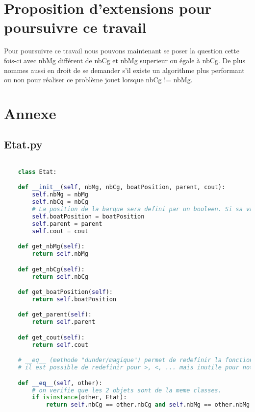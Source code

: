 \documentclass[a4paper, 12pt, french,oneside]{book}
\begin{document}
\chapter{Proposition d'extensions pour poursuivre ce travail}
Pour poursuivre ce travail nous pouvons maintenant se poser la question cette fois-ci avec nbMg différent de nbCg et nbMg superieur ou égale à nbCg. De plus nommes aussi en droit de se demander s'il existe un algorithme plus performant ou non pour réaliser ce problème jouet lorsque nbCg != nbMg.

\appendix
\chapter{Annexe}
\section{Etat.py}
\begin{lstlisting}[language=Python, caption=Python example] 

    class Etat:

    def __init__(self, nbMg, nbCg, boatPosition, parent, cout):
        self.nbMg = nbMg
        self.nbCg = nbCg
        # La position de la barque sera defini par un booleen. Si sa valeur est egale a vraie alors la barque est a guache sinon elle est a droite
        self.boatPosition = boatPosition
        self.parent = parent
        self.cout = cout

    def get_nbMg(self):
        return self.nbMg

    def get_nbCg(self):
        return self.nbCg

    def get_boatPosition(self):
        return self.boatPosition

    def get_parent(self):
        return self.parent

    def get_cout(self):
        return self.cout

    # __eq__ (methode "dunder/magique") permet de redefinir la fonction ==. Cela nous sera utile pour verifie si 2 etats sont egaux. (fonctionne avec .remove() pour la comparaison d'etat)
    # il est possible de redefinir pour >, <, ... mais inutile pour notre cas.

    def __eq__(self, other):
        # on verifie que les 2 objets sont de la meme classes.
        if isinstance(other, Etat):
            return self.nbCg == other.nbCg and self.nbMg == other.nbMg and self.boatPosition == other.boatPosition
\end{lstlisting}
\end{document}
